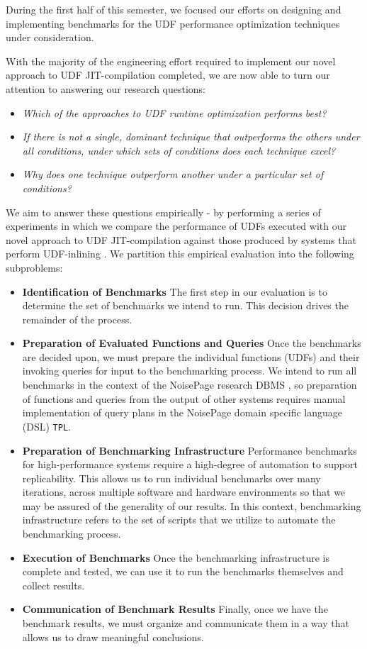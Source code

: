 \documentclass{vldb}
\newcommand{\tpl}{\texttt{TPL}\xspace}
\begin{document}
During the first half of this semester, we focused our efforts on designing and implementing benchmarks for the UDF performance optimization techniques under consideration. 

With the majority of the engineering effort required to implement our novel approach to UDF JIT-compilation completed, we are now able to turn our attention to answering our research questions: 

\begin{itemize}
    \item \textit{Which of the approaches to UDF runtime optimization performs best?}
    \item \textit{If there is not a single, dominant technique that outperforms the others under all conditions, under which sets of conditions does each technique excel?}
    \item \textit{Why does one technique outperform another under a particular set of conditions?}
\end{itemize}

We aim to answer these questions empirically - by performing a series of experiments in which we compare the performance of UDFs executed with our novel approach to UDF JIT-compilation against those produced by systems that perform UDF-inlining \cite{apfel, froid}. We partition this empirical evaluation into the following subproblems:

\begin{itemize}
    \item \textbf{Identification of Benchmarks} The first step in our evaluation is to determine the set of benchmarks we intend to run. This decision drives the remainder of the process.
    \item \textbf{Preparation of Evaluated Functions and Queries} Once the benchmarks are decided upon, we must prepare the individual functions (UDFs) and their invoking queries for input to the benchmarking process. We intend to run all benchmarks in the context of the NoisePage research DBMS \cite{noisepage}, so preparation of functions and queries from the output of other systems requires manual implementation of query plans in the NoisePage domain specific language (DSL) \tpl.
    \item \textbf{Preparation of Benchmarking Infrastructure} Performance benchmarks for high-performance systems require a high-degree of automation to support replicability. This allows us to run individual benchmarks over many iterations, across multiple software and hardware environments so that we may be assured of the generality of our results. In this context, benchmarking infrastructure refers to the set of scripts that we utilize to automate the benchmarking process.
    \item \textbf{Execution of Benchmarks} Once the benchmarking infrastructure is complete and tested, we can use it to run the benchmarks themselves and collect results.
    \item \textbf{Communication of Benchmark Results} Finally, once we have the benchmark results, we must organize and communicate them in a way that allows us to draw meaningful conclusions.
\end{itemize}
\end{document}
